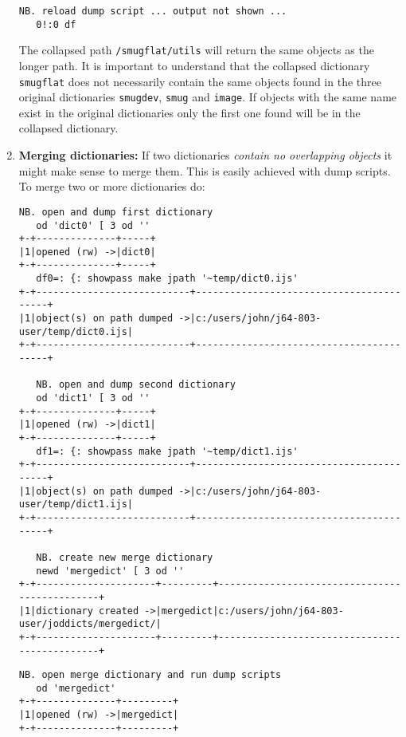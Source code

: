 \begin{enumerate}
\begin{lstlisting}[frame=single,framerule=0pt,basicstyle=\ttfamily\footnotesize]
   NB. reload dump script ... output not shown ...  
   0!:0 df
\end{lstlisting}

The collapsed path \texttt{/smugflat/utils} will return the same objects as the longer path.
It is important to understand that the collapsed dictionary \texttt{smugflat} does not necessarily contain
the same objects found in the three original dictionaries \texttt{smugdev}, \texttt{smug} and \texttt{image}.
If objects with the same name exist in the original dictionaries only the first one found will 
be in the collapsed dictionary.


\item \textbf{Merging dictionaries:} If two dictionaries \emph{contain no overlapping objects} it might make
sense to merge them. This is easily achieved with dump scripts. To merge two or more dictionaries do:

\begin{lstlisting}[frame=single,framerule=0pt,basicstyle=\ttfamily\footnotesize]
   NB. open and dump first dictionary
   od 'dict0' [ 3 od ''
+-+--------------+-----+
|1|opened (rw) ->|dict0|
+-+--------------+-----+
   df0=: {: showpass make jpath '~temp/dict0.ijs'
+-+---------------------------+-----------------------------------------+
|1|object(s) on path dumped ->|c:/users/john/j64-803-user/temp/dict0.ijs|
+-+---------------------------+-----------------------------------------+
   
   NB. open and dump second dictionary
   od 'dict1' [ 3 od ''
+-+--------------+-----+
|1|opened (rw) ->|dict1|
+-+--------------+-----+
   df1=: {: showpass make jpath '~temp/dict1.ijs'
+-+---------------------------+-----------------------------------------+
|1|object(s) on path dumped ->|c:/users/john/j64-803-user/temp/dict1.ijs|
+-+---------------------------+-----------------------------------------+
   
   NB. create new merge dictionary
   newd 'mergedict' [ 3 od ''
+-+---------------------+---------+----------------------------------------------+
|1|dictionary created ->|mergedict|c:/users/john/j64-803-user/joddicts/mergedict/|
+-+---------------------+---------+----------------------------------------------+
\end{lstlisting}

   \newpage
   
\begin{lstlisting}[frame=single,framerule=0pt,basicstyle=\ttfamily\footnotesize]   
   NB. open merge dictionary and run dump scripts
   od 'mergedict'
+-+--------------+---------+
|1|opened (rw) ->|mergedict|
+-+--------------+---------+


\end{lstlisting}
\end{enumerate}
